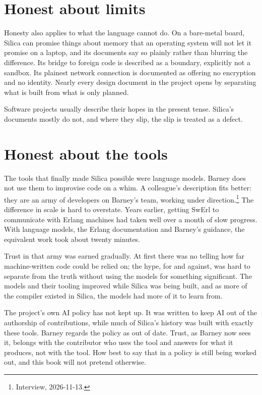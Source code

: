 \section{Honest about limits}

Honesty also applies to what the language cannot do. On a bare-metal board,
Silica can promise things about memory that an operating system will not let it
promise on a laptop, and its documents say so plainly rather than blurring the
difference. Its bridge to foreign code is described as a boundary, explicitly
not a sandbox. Its plainest network connection is documented as offering no
encryption and no identity. Nearly every design document in the project opens
by separating what is built from what is only planned.

Software projects usually describe their hopes in the present tense. Silica's
documents mostly do not, and where they slip, the slip is treated as a defect.

\section{Honest about the tools}

The tools that finally made Silica possible were language models. Barney does
not use them to improvise code on a whim. A colleague's description fits
better: they are an army of developers on Barney's team, working under
direction.\footnote{Interview, 2026-11-13.} The difference in scale is hard to
overstate. Years earlier, getting SwErl to communicate with Erlang machines had
taken well over a month of slow progress. With language models, the Erlang
documentation and Barney's guidance, the equivalent work took about twenty
minutes.

Trust in that army was earned gradually. At first there was no telling how far
machine-written code could be relied on; the hype, for and against, was hard to
separate from the truth without using the models for something significant. The
models and their tooling improved while Silica was being built, and as more of
the compiler existed in Silica, the models had more of it to learn from.

The project's own AI policy has not kept up. It was written to keep AI out of
the authorship of contributions, while much of Silica's history was built with
exactly these tools. Barney regards the policy as out of date. Trust, as Barney
now sees it, belongs with the contributor who uses the tool and answers for
what it produces, not with the tool. How best to say that in a policy is still
being worked out, and this book will not pretend otherwise.

